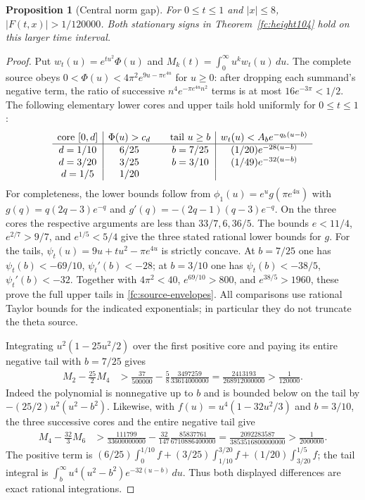 \documentclass[11pt]{article}
\numberwithin{equation}{section}
\newtheorem{proposition}[theorem]{Proposition}
\theoremstyle{definition}
\theoremstyle{remark}
\begin{document}
\begin{proposition}[Central norm gap]
\label{fc:central}
For $0\le t\le1$ and $|x|\le8$,
$|F(t,x)|>1/120000$.  Both stationary signs in
Theorem~\ref{fc:height104} hold on this larger time interval.
\end{proposition}
\begin{proof}
Put $w_t(u)=e^{tu^2}\Phi(u)$ and
$M_k(t)=\int_0^\infty u^kw_t(u)\,du$.
The complete source obeys
$0<\Phi(u)<4\pi^2e^{9u-\pi e^{4u}}$ for $u\ge0$:
after dropping each summand's negative term, the ratio of successive
$n^4e^{-\pi e^{4u}n^2}$ terms is at most $16e^{-3\pi}<1/2$.
The following elementary lower cores and upper tails hold uniformly
for $0\le t\le1$:
\begin{equation}
 \begin{array}{c|c@{\qquad}c|c}
 \text{core }[0,d]&\Phi(u)>c_d&\text{tail }u\ge b&w_t(u)<A_be^{-q_b(u-b)}\\ \hline
 d=1/10&6/25&b=7/25&(1/20)e^{-28(u-b)}\\
 d=3/20&3/25&b=3/10&(1/49)e^{-32(u-b)}\\
 d=1/5&1/20&&
 \end{array}
 \label{fc:source-envelopes}
\end{equation}
For completeness, the lower bounds follow from
$\phi_1(u)=e^ug(\pi e^{4u})$ with
$g(q)=q(2q-3)e^{-q}$ and $g'(q)=-(2q-1)(q-3)e^{-q}$.
On the three cores the respective arguments are less than
$33/7,6,36/5$.  The bounds
$e<11/4$, $e^{2/7}>9/7$, and $e^{1/5}<5/4$ give the three stated
rational lower bounds for $g$.
For the tails, $\psi_t(u)=9u+tu^2-\pi e^{4u}$ is strictly concave.
At $b=7/25$ one has $\psi_t(b)<-69/10$, $\psi_t'(b)<-28$;
at $b=3/10$ one has $\psi_t(b)<-38/5$, $\psi_t'(b)<-32$.
Together with $4\pi^2<40$, $e^{69/10}>800$, and $e^{38/5}>1960$,
these prove the full upper tails in \eqref{fc:source-envelopes}.
All comparisons use rational Taylor bounds for the indicated
exponentials; in particular they do not truncate the theta source.

Integrating $u^2(1-25u^2/2)$ over the first positive core and paying
its entire negative tail with $b=7/25$ gives
\begin{align}
 M_2-\frac{25}{2}M_4
 &>\frac{37}{500000}
   -\frac58\frac{3497259}{33614000000}
   =\frac{2413193}{268912000000}>\frac1{120000}.
 \label{fc:moment24}
\end{align}
Indeed the polynomial is nonnegative up to $b$ and is bounded below
on the tail by $-(25/2)u^2(u^2-b^2)$.
Likewise, with $f(u)=u^4(1-32u^2/3)$ and $b=3/10$, the three
successive cores and the entire negative tail give
\begin{align}
 M_4-\frac{32}{3}M_6
 &>\frac{111799}{33600000000}
   -\frac{32}{147}\frac{85837761}{6710886400000}
   =\frac{2092283587}{3853516800000000}>\frac1{2000000}.
 \label{fc:moment46}
\end{align}
The positive term is
$(6/25)\int_0^{1/10}f+(3/25)\int_{1/10}^{3/20}f
 +(1/20)\int_{3/20}^{1/5}f$;
the tail integral is
$\int_b^\infty u^4(u^2-b^2)e^{-32(u-b)}\,du$.
Thus both displayed differences are exact rational integrations.


\end{proof}
\end{document}
